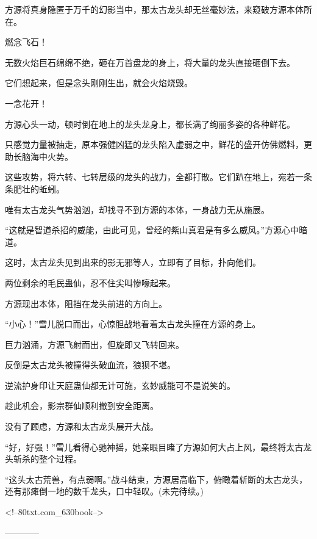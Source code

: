 \begin{this_body}
方源将真身隐匿于万千的幻影当中，那太古龙头却无丝毫妙法，来窥破方源本体所在。

燃念飞石！

无数火焰巨石绵绵不绝，砸在万首盘龙的身上，将大量的龙头直接砸倒下去。

它们想起来，但是念头刚刚生出，就会火焰烧毁。

一念花开！

方源心头一动，顿时倒在地上的龙头龙身上，都长满了绚丽多姿的各种鲜花。

只感觉力量被抽走，原本强健凶猛的龙头陷入虚弱之中，鲜花的盛开仿佛燃料，更助长脑海中火势。

这些攻势，将六转、七转层级的龙头的战力，全都打散。它们趴在地上，宛若一条条肥壮的蚯蚓。

唯有太古龙头气势汹汹，却找寻不到方源的本体，一身战力无从施展。

“这就是智道杀招的威能，由此可见，曾经的紫山真君是有多么威风。”方源心中暗道。

这时，太古龙头见到出来的影无邪等人，立即有了目标，扑向他们。

两位剩余的毛民蛊仙，忍不住尖叫惨嚎起来。

方源现出本体，阻挡在龙头前进的方向上。

“小心！”雪儿脱口而出，心惊胆战地看着太古龙头撞在方源的身上。

巨力汹涌，方源飞射而出，但旋即又飞转回来。

反倒是太古龙头被撞得头破血流，狼狈不堪。

逆流护身印让天庭蛊仙都无计可施，玄妙威能可不是说笑的。

趁此机会，影宗群仙顺利撤到安全距离。

没有了顾虑，方源和太古龙头展开大战。

“好，好强！”雪儿看得心驰神摇，她亲眼目睹了方源如何大占上风，最终将太古龙头斩杀的整个过程。

“这头太古荒兽，有点弱啊。”战斗结束，方源居高临下，俯瞰着斩断的太古龙头，还有那瘫倒一地的数千龙头，口中轻叹。(未完待续。)

<!--80txt.com\_630book-->

------------

\end{this_body}

